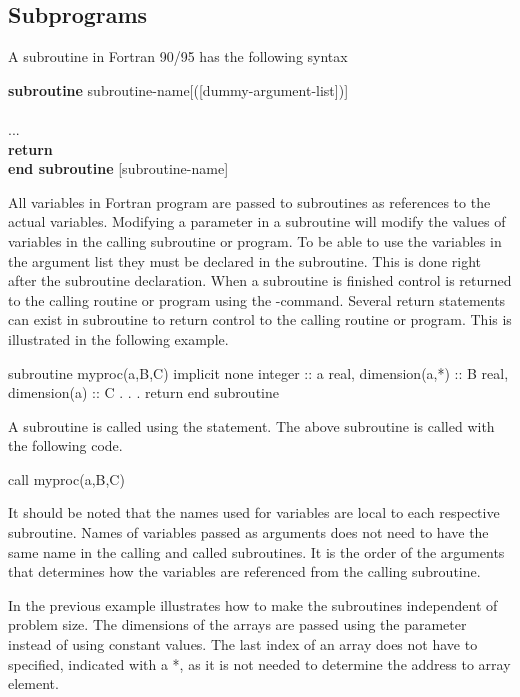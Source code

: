 \subsection{Subprograms}

A subroutine in Fortran 90/95 has the following syntax

\begin{fsyntax}
\textbf{subroutine} subroutine-name[([dummy-argument-list])]\\
\\
\ftab ...\\
\ftab \textbf{return}\\
\textbf{end subroutine} [subroutine-name]
\end{fsyntax}

All variables in Fortran program are passed to subroutines as references to the actual variables. Modifying a parameter in a subroutine will modify the values of variables in the calling subroutine or program. To be able to use the variables in the argument list they must be declared in the subroutine. This is done right after the subroutine declaration. When a subroutine is finished control is returned to the calling routine or program using the -command. Several return statements can exist in subroutine to return control to the calling routine or program. This is illustrated in the following example.

\begin{fortrancodeenv}
subroutine myproc(a,B,C)
    implicit none
    integer :: a
    real, dimension(a,*) :: B
    real, dimension(a) :: C
    .
    .
    .
    return
end subroutine
\end{fortrancodeenv}

A subroutine is called using the  statement. The above subroutine is called with the following code.

\begin{fortrancodeenv}
call myproc(a,B,C)
\end{fortrancodeenv}

It should be noted that the names used for variables are local to each respective subroutine. Names of variables passed as arguments does not need to have the same name in the calling and called subroutines. It is the order of the arguments that determines how the variables are referenced from the calling subroutine.

In the previous example illustrates how to make the subroutines independent of problem size. The dimensions of the arrays are passed using the  parameter instead of using constant values. The last index of an array does not have to specified, indicated with a *, as it is not needed to determine the address to array element.

